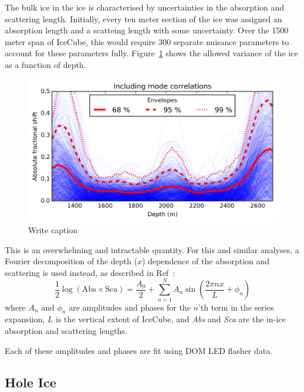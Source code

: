 \documentclass[main.tex]{subfiles}
\begin{document}
The bulk ice in the ice is characterised by uncertainties in the absorption and scattering length. 
Initially, every ten meter section of the ice was assigned an absorption length and a scatteing length with some uncertainty. 
Over the 1500 meter span of IceCube, this would require 300 separate nuisance parameters to account for these parameters fully.
Figure~\ref{fig:iceabsfracshift} shows the allowed variance of the ice as a function of depth. 
\begin{figure}
    \centering
    \includegraphics[width=0.9\linewidth]{./figures/AbsFracShift.png}
    \caption{Write caption}\label{fig:iceabsfracshift}
\end{figure}

This is an overwhelming and intractable quantity. 
For this and similar analyses, a Fourier decomposition of the depth ($x$) dependence of the absorption and scattering is used instead, as described in Ref~\cite{Aartsen_2019_snow}: 
\begin{equation}
    \dfrac{1}{2}\log\left(\text{Abs} \times \text{Sca}\right) = \dfrac{A_{0}}{2} +\sum\limits_{n=1}^{N}A_{n} \sin\left(\dfrac{2\pi nx}{L} + \phi_{n}\right)
\end{equation}
where $A_{n}$ and $\phi_{n}$ are amplitudes and phases for the $n$'th term in the series expansiion, $L$ is the vertical extent of IceCube, and \textit{Abs} and \textit{Sca} are the in-ice absorption and scattering lengths. 

Each of these amplitudes and phases are fit using DOM LED flasher data.

\subsection{Hole Ice}
\end{document}

